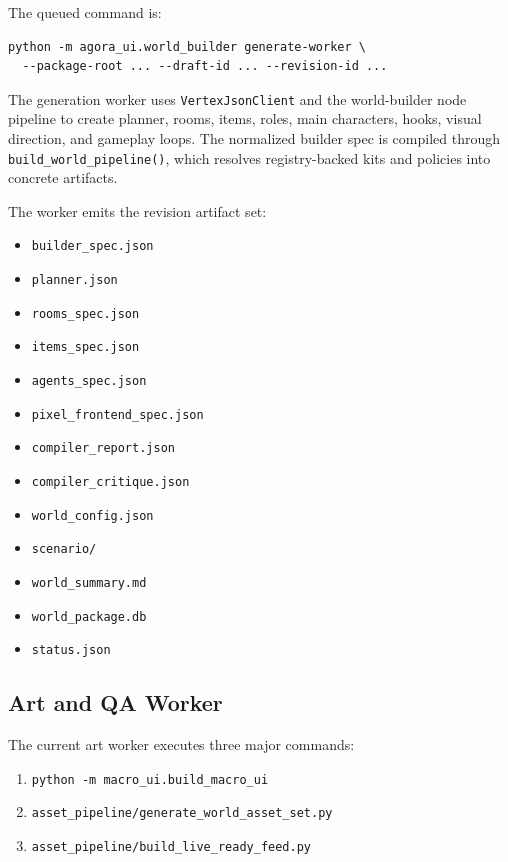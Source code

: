 \documentclass[11pt]{article}
\begin{document}
The queued command is:

\begin{verbatim}
python -m agora_ui.world_builder generate-worker \
  --package-root ... --draft-id ... --revision-id ...
\end{verbatim}

The generation worker uses \texttt{VertexJsonClient} and the world-builder node pipeline to create planner, rooms, items, roles, main characters, hooks, visual direction, and gameplay loops. The normalized builder spec is compiled through \texttt{build\_world\_pipeline()}, which resolves registry-backed kits and policies into concrete artifacts.

The worker emits the revision artifact set:

\begin{itemize}
  \item \texttt{builder\_spec.json}
  \item \texttt{planner.json}
  \item \texttt{rooms\_spec.json}
  \item \texttt{items\_spec.json}
  \item \texttt{agents\_spec.json}
  \item \texttt{pixel\_frontend\_spec.json}
  \item \texttt{compiler\_report.json}
  \item \texttt{compiler\_critique.json}
  \item \texttt{world\_config.json}
  \item \texttt{scenario/}
  \item \texttt{world\_summary.md}
  \item \texttt{world\_package.db}
  \item \texttt{status.json}
\end{itemize}

\subsection{Art and QA Worker}

The current art worker executes three major commands:

\begin{enumerate}
  \item \texttt{python -m macro\_ui.build\_macro\_ui}
  \item \texttt{asset\_pipeline/generate\_world\_asset\_set.py}
  \item \texttt{asset\_pipeline/build\_live\_ready\_feed.py}
\end{enumerate}
\end{document}

